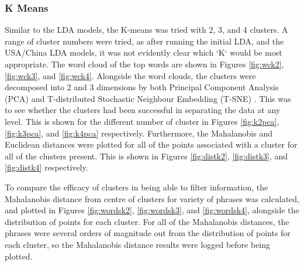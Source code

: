 \subsubsection{K Means}
Similar to the LDA models, the K-means was tried with 2, 3, and 4 clusters. A range of cluster numbers were tried, as after running the initial LDA, and the USA/China LDA models, it was not evidently clear which `K` would be most appropriate. The word cloud of the top words are shown in Figures \ref{fig:wck2}, \ref{fig:wck3}, and \ref{fig:wck4}. Alongside the word clouds, the clusters were decomposed into 2 and 3 dimensions by both Principal Component Analysis (PCA) and T-distributed Stochastic Neighbour Embedding (T-SNE) \cite{maaten2008visualizing}. This was to see whether the clusters had been successful in separating the data at any level. This is shown for the different number of cluster in Figures \ref{fig:k2pca}, \ref{fig:k3pca}, and \ref{fig:k4pca} respectively. Furthermore, the Mahalanobis and Euclidean distances were plotted for all of the points associated with a cluster for all of the clusters present. This is shown in Figures \ref{fig:distk2}, \ref{fig:distk3}, and \ref{fig:distk4} respectively. 

To compare the efficacy of clusters in being able to filter information, the Mahalanobis distance from centre of clusters for variety of phrases was calculated, and plotted in Figures \ref{fig:wordsk2}, \ref{fig:wordsk3}, and \ref{fig:wordsk4}, alongside the distribution of points for each cluster. For all of the Mahalanobis distances, the phrases were several orders of magnitude out from the distribution of points for each cluster, so the Mahalanobis distance results were logged before being plotted.  
